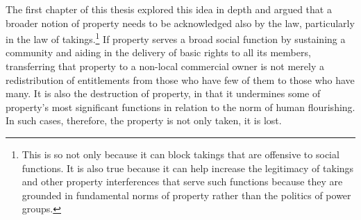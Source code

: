 The first chapter of this thesis explored this idea in depth and argued that a broader notion of property needs to be acknowledged also by the law, particularly in the law of takings.\footnote{This is so not only because it can block takings that are offensive to social functions. It is also true because it can help increase the legitimacy of takings and other property interferences that serve such functions because they are grounded in fundamental norms of property rather than the politics of power groups.} If property serves a broad social function by sustaining a community and aiding in the delivery of basic rights to all its members, transferring that property to a non-local commercial owner is not merely a redistribution of entitlements from those who have few of them to those who have many. It is also the destruction of property, in that it undermines some of property's most significant functions in relation to the norm of human flourishing. In such cases, therefore, the property is not only taken, it is lost.

